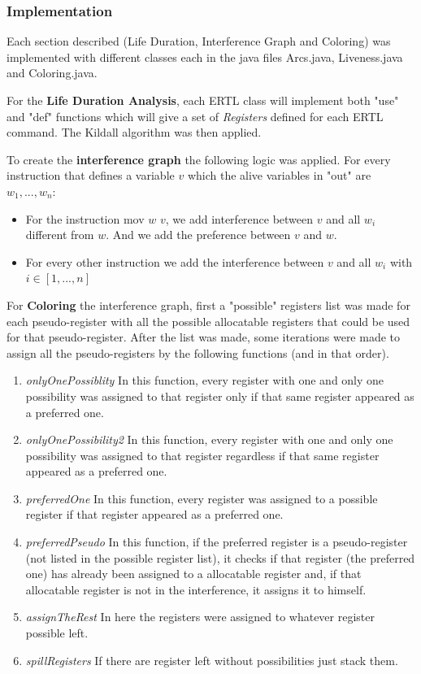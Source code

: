\documentclass[conference]{IEEEtran}
\theoremstyle{definition}
\begin{document}
\subsubsection{Implementation}

Each section described (Life Duration, Interference Graph and Coloring) was implemented with different classes each in the java files Arcs.java, Liveness.java and Coloring.java.

For the \textbf{Life Duration Analysis}, each ERTL class will implement both "use" and "def" functions which will give a set of \textit{Registers} defined for each ERTL command.
The Kildall algorithm was then applied.

To create the \textbf{interference graph} the following logic was applied. For every instruction that defines a variable $v$  which the alive variables in "out" are \(w_{1}, ..., w_{n}\):
\begin{itemize}
	\item For the instruction mov $w$ $v$, we add interference between $v$ and all $w_{i}$ different from $w$. And we add the preference between $v$ and $w$.
	\item For every other instruction we add the interference between $v$ and all $w_{i}$ with \(i \in [1, ..., n]\)
\end{itemize}

For \textbf{Coloring} the interference graph, first a "possible" registers list was made for each pseudo-register with all the possible allocatable registers that could be used for that pseudo-register. After the list was made, some iterations were made to assign all the pseudo-registers by the following functions (and in that order).

\begin{enumerate}
	\item \textit{onlyOnePossiblity} In this function, every register with one and only one possibility was assigned to that register only if that same register appeared as a preferred one.
	\item \textit{onlyOnePossibility2} In this function, every register with one and only one possibility was assigned to that register regardless if that same register appeared as a preferred one.
	\item \textit{preferredOne} In this function, every register was assigned to a possible register if that register appeared as a preferred one.
	\item \textit{preferredPseudo} In this function, if the preferred register is a pseudo-register (not listed in the possible register list), it checks if that register (the preferred one) has already been assigned to a allocatable register and, if that allocatable register is not in the interference, it assigns it to himself.
	\item \textit{assignTheRest} In here the registers were assigned to whatever register possible left.
	\item \textit{spillRegisters} If there are register left without possibilities just stack them.
\end{enumerate}
\end{document}
